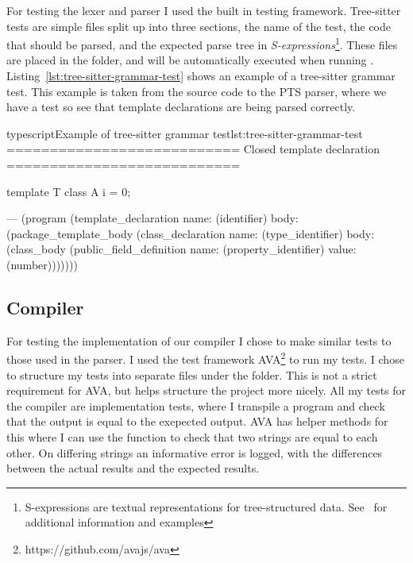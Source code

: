 For testing the lexer and parser I used the built in testing framework.
Tree-sitter tests are simple  files split up into three sections, the name of the test, the code that should be parsed, and the expected parse tree in \textit{S-expressions}\footnote{S-expressions are textual representations for tree-structured data. See~\cite{sexprs} for additional information and examples}.
These files are placed in the  folder, and will be automatically executed when running .
Listing~\vref{lst:tree-sitter-grammar-test} shows an example of a tree-sitter grammar test.
This example is taken from the source code to the PTS parser, where we have a test so see that template declarations are being parsed correctly.

\begin{code}{typescript}{Example of tree-sitter grammar test}{lst:tree-sitter-grammar-test}
    ===========================
    Closed template declaration
    ===========================

    template T {
        class A {
            i = 0;
        }
    }

    ---
    (program
        (template_declaration
            name: (identifier)
            body: (package_template_body
                    (class_declaration
                        name: (type_identifier)
                        body: (class_body
                            (public_field_definition
                                name: (property_identifier)
                                value: (number)))))))

\end{code}

\subsection{Compiler}\label{subsec:testing-transpiler}

For testing the implementation of our compiler I chose to make similar tests to those used in the parser.
I used the test framework AVA\footnote{https://github.com/avajs/ava} to run my tests.
I chose to structure my tests into separate files under the  folder.
This is not a strict requirement for AVA, but helps structure the project more nicely.
All my tests for the compiler are implementation tests, where I transpile a program and check that the output is equal to the exepected output.
AVA has helper methods for this where I can use the  function to check that two strings are equal to each other.
On differing strings an informative error is logged, with the differences between the actual results and the expected results.

